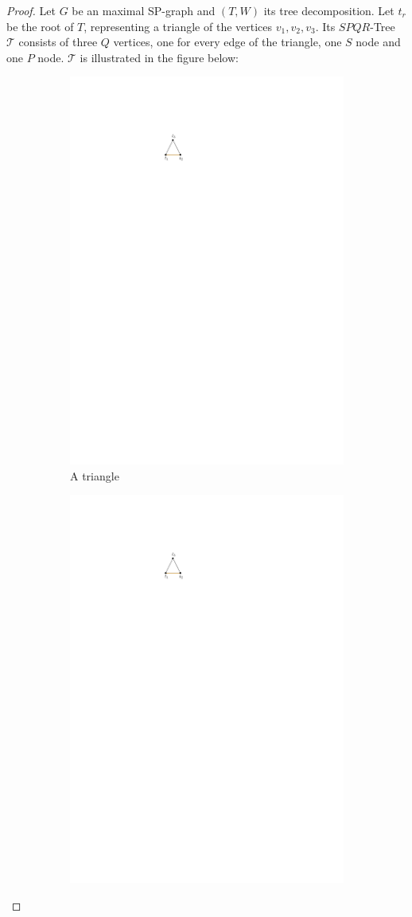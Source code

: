 \begin{proof}
	Let $G$ be an maximal SP-graph and $(T,W)$ its tree decomposition. Let $t_r$ be the root of $T$, representing a triangle of the vertices $v_1,v_2,v_3$. Its $SPQR$-Tree $\mathcal{T}$ consists of three $Q$ vertices, one for every edge of the triangle, one $S$ node and one $P$ node. $\mathcal{T}$ is illustrated in the figure below:
	\begin{figure}[H]
		\begin{subfigure}{0.4\textwidth}
			\centering
			\includegraphics[page=1,width=0.7\linewidth]{graphics/SP_graphs_SPQR_inserting.pdf}
			\caption{A triangle}\label{im:SPQR_insert_a}
		\end{subfigure}
		\begin{subfigure}{0.4\textwidth}
			\centering
			\includegraphics[page=2,width=0.7\linewidth]{graphics/SP_graphs_SPQR_inserting.pdf}

\end{subfigure}
\end{figure}
\end{proof}
